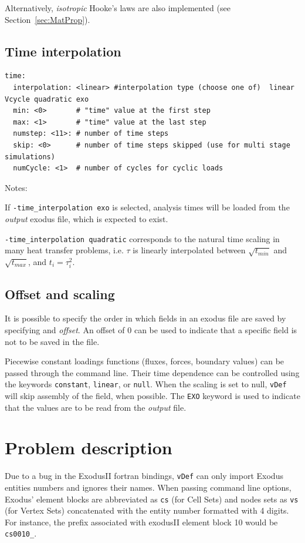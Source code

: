 \documentclass[10pt,oneside]{report}
\def\vDef{{\texttt{vDef}} }
\begin{document}
Alternatively, \emph{isotropic} Hooke's laws are also implemented (see Section~\ref{sec:MatProp}).


\subsection{Time interpolation}
\begin{verbatim}
time:
  interpolation: <linear> #interpolation type (choose one of)  linear Vcycle quadratic exo
  min: <0>       # "time" value at the first step
  max: <1>       # "time" value at the last step
  numstep: <11>: # number of time steps 
  skip: <0>      # number of time steps skipped (use for multi stage simulations)
  numCycle: <1>  # number of cycles for cyclic loads
\end{verbatim}

Notes: 
\begin{compactenum}
	\item If \verb+-time_interpolation exo+ is selected, analysis times will be loaded from the \emph{output} exodus file, which is expected to exist.
	\item \verb+-time_interpolation quadratic+ corresponds to the natural time scaling in many heat transfer problems, i.e. $\tau$ is linearly interpolated between $\sqrt{t_{min}}$ and $\sqrt{t_{max}}$, and $t_i = \tau_i^2$.
\end{compactenum}

\subsection{Offset and scaling}
It is possible to specify the order in which fields in an exodus file are saved by specifying and \emph{offset}. An offset of 0 can be used to indicate that a specific field is not to be saved in the file.

Piecewise constant loadings functions (fluxes, forces, boundary values) can be passed through the command line. Their time dependence can be controlled using the keywords \verb+constant+, \verb+linear+, or \verb+null+. When the scaling is set to null, \vDef will skip assembly of the field, when possible. The \verb+EXO+ keyword is used to indicate that the values are to be read from the \emph{output} file.

\section{Problem description}
Due to a bug in the ExodusII fortran bindings, \vDef can only import Exodus entities numbers and ignores their names. When passing command line options, Exodus' element blocks are abbreviated as \verb+cs+ (for Cell Sets) and nodes sets as \verb+vs+ (for Vertex Sets) concatenated with the entity number formatted with 4 digits. For instance, the prefix associated with exodusII element block 10 would be \verb+cs0010_+.
\end{document}
